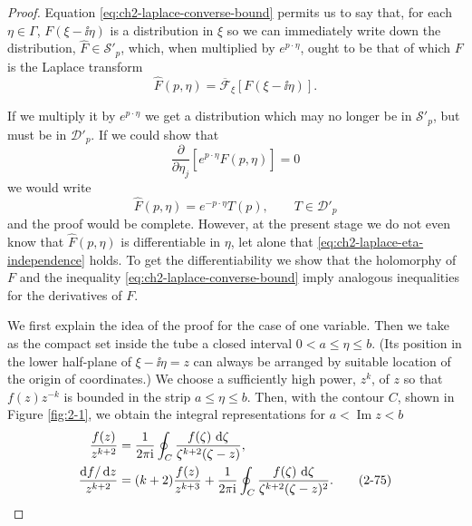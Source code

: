 \begin{proof}
Equation \eqref{eq:ch2-laplace-converse-bound} permits us to say that, for each $\eta\in\Gamma$,
$F(\xi-\ii\eta)$ is a distribution in $\xi$ so we can immediately write
down the distribution, $\widehat{F}\in\mathcal{S}'_p$, which, when
multiplied by $e^{p\cdot\eta}$, ought to be that of which $F$ is the
Laplace transform
\begin{equation*}
  \widehat{F}(p,\eta)=\overline{\mathcal{F}}_{\xi}
  [F(\xi-\ii\eta)].
\end{equation*}

If we multiply it by $e^{p\cdot\eta}$ we get a distribution which may no
longer be in $\mathcal{S}'_p$, but must be in $\mathcal{D}'_p$.  If we could
show that
\begin{equation}
  \frac{\partial}{\partial\eta_j}
  [e^{p\cdot\eta}\widehat{F}(p,\eta)]=0
  \tag{2-73}\label{eq:ch2-laplace-eta-independence}
\end{equation}
we would write
\begin{equation}
  \widehat{F}(p,\eta)=e^{-p\cdot\eta}T(p),
  \qquad T\in\mathcal{D}'_p
  \tag{2-74}\label{eq:ch2-laplace-inverse-form}
\end{equation}
and the proof would be complete.  However, at the present stage we do not
even know that $\widehat{F}(p,\eta)$ is differentiable in $\eta$, let alone
that \eqref{eq:ch2-laplace-eta-independence} holds.  To get the differentiability we show that the
holomorphy of $F$ and the inequality \eqref{eq:ch2-laplace-converse-bound} imply analogous inequalities
for the derivatives of $F$.

We first explain the idea of the proof for the case of one variable.  Then
we take as the compact set inside the tube a closed interval
$0<a\leq\eta\leq b$.  (Its position in the lower half-plane of
$\xi-\ii\eta=z$ can always be arranged by suitable location of the origin of
coordinates.)  We choose a sufficiently high power, $z^k$, of $z$ so that
$f(z)z^{-k}$ is bounded in the strip $a\leq\eta\leq b$.  Then, with the
contour $C$, shown in Figure \ref{fig:2-1}, we obtain the integral representations
for $a<\operatorname{Im}z<b$
\begin{align}
  \frac{f(z)}{z^{k+2}}
  &=\frac{1}{2\pi \mathrm{i}}\oint_C
    \frac{f(\zeta)\,\mathop{}\!\mathrm{d}\zeta}{\zeta^{k+2}(\zeta-z)}, \notag\\
  \frac{\mathop{}\!\mathrm{d} f/\mathop{}\!\mathrm{d} z}{z^{k+2}}
  &=(k+2)\frac{f(z)}{z^{k+3}}
    +\frac{1}{2\pi \mathrm{i}}\oint_C
    \frac{f(\zeta)\,\mathop{}\!\mathrm{d}\zeta}{\zeta^{k+2}(\zeta-z)^2} .
  \tag{2-75}\label{eq:ch2-cauchy-strip-derivative}
\end{align}


\end{proof}
